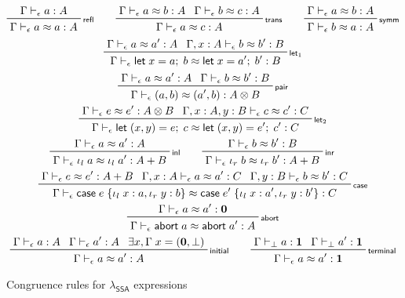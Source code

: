 \documentclass[acmsmall,screen,review]{acmart}
\newcommand{\mb}[1]{\ensuremath{\mathbf{#1}}}
\newcommand{\ms}[1]{\ensuremath{\mathsf{#1}}}
\newcommand{\lto}{:}
\newcommand{\linl}[1]{\iota_l\;{#1}}
\newcommand{\linr}[1]{\iota_r\;{#1}}
\newcommand{\labort}[1]{\ms{abort}\;{#1}}
\newcommand{\letexpr}[3]{\ensuremath{\ms{let}\;#1 = #2;\;#3}}
\newcommand{\caseexpr}[5]{\ms{case}\;#1\;\{\linl{#2} \lto #3, \linr{#4} \lto #5\}}
\newcommand{\bhyp}[2]{#1 : #2}
\newcommand{\rle}[1]{{\scriptsize\textsf{#1}}}
\newcommand{\hasty}[4]{#1 \vdash_{#2} #3: {#4}}
\newcommand{\teqv}{\approx}
\newcommand{\tmeq}[5]{#1 \vdash_{#2} #3 \teqv #4 : {#5}}
\newcommand{\isotopessa}{\(\lambda_{\ms{SSA}}\)}
\begin{document}
\begin{figure}
  \begin{gather*}
    \prftree[r]{\rle{refl}}{\hasty{\Gamma}{\epsilon}{a}{A}}{\tmeq{\Gamma}{\epsilon}{a}{a}{A}} \qquad
    \prftree[r]{\rle{trans}}
      {\tmeq{\Gamma}{\epsilon}{a}{b}{A}}
      {\tmeq{\Gamma}{\epsilon}{b}{c}{A}} 
      {\tmeq{\Gamma}{\epsilon}{a}{c}{A}} \qquad
    \prftree[r]{\rle{symm}}
      {\tmeq{\Gamma}{\epsilon}{a}{b}{A}}
      {\tmeq{\Gamma}{\epsilon}{b}{a}{A}}
    \\
    \prftree[r]{\rle{let$_1$}}
      {\tmeq{\Gamma}{\epsilon}{a}{a'}{A}}
      {\tmeq{\Gamma, \bhyp{x}{A}}{\epsilon}{b}{b'}{B}}
      {\tmeq{\Gamma}{\epsilon}{\letexpr{x}{a}{b}}{\letexpr{x}{a'}{b'}}{B}} 
    \\
    \prftree[r]{\rle{pair}}
      {\tmeq{\Gamma}{\epsilon}{a}{a'}{A}}
      {\tmeq{\Gamma}{\epsilon}{b}{b'}{B}}
      {\tmeq{\Gamma}{\epsilon}{(a, b)}{(a', b)}{A \otimes B}}
    \\
    \prftree[r]{\rle{let$_2$}}
      {\tmeq{\Gamma}{\epsilon}{e}{e'}{A \otimes B}}
      {\tmeq{\Gamma, \bhyp{x}{A}, \bhyp{y}{B}}{\epsilon}{c}{c'}{C}}
      {\tmeq{\Gamma}{\epsilon}{\letexpr{(x, y)}{e}{c}}{\letexpr{(x, y)}{e'}{c'}}{C}}
    \\
    \prftree[r]{\rle{inl}}
      {\tmeq{\Gamma}{\epsilon}{a}{a'}{A}}
      {\tmeq{\Gamma}{\epsilon}{\linl{a}}{\linl{a'}}{A + B}} \qquad
    \prftree[r]{\rle{inr}}
      {\tmeq{\Gamma}{\epsilon}{b}{b'}{B}}
      {\tmeq{\Gamma}{\epsilon}{\linr{b}}{\linr{b'}}{A + B}} \qquad
    \\
    \prftree[r]{\rle{case}}
      {\tmeq{\Gamma}{\epsilon}{e}{e'}{A + B}}
      {\tmeq{\Gamma, \bhyp{x}{A}}{\epsilon}{a}{a'}{C}}
      {\tmeq{\Gamma, \bhyp{y}{B}}{\epsilon}{b}{b'}{C}}
      {\tmeq{\Gamma}{\epsilon}{\caseexpr{e}{x}{a}{y}{b}}{\caseexpr{e'}{x}{a'}{y}{b'}}{C}}
    \\
    \prftree[r]{\rle{abort}}
      {\tmeq{\Gamma}{\epsilon}{a}{a'}{\mb{0}}}
      {\tmeq{\Gamma}{\epsilon}{\labort{a}}{\labort{a'}}{A}}
    \\
    \prftree[r]{\rle{initial}} 
      {\hasty{\Gamma}{\epsilon}{a}{A}}
      {\hasty{\Gamma}{\epsilon}{a'}{A}}
      {\exists x, \Gamma\;x = (\mb{0}, \bot)}
      {\tmeq{\Gamma}{\epsilon}{a}{a'}{A}}
      \qquad
    \prftree[r]{\rle{terminal}}
      {\hasty{\Gamma}{\bot}{a}{\mb{1}}}
      {\hasty{\Gamma}{\bot}{a'}{\mb{1}}}
      {\tmeq{\Gamma}{\epsilon}{a}{a'}{\mb{1}}}
  \end{gather*}
  \caption{Congruence rules for \isotopessa{} expressions}
  \Description{}
  \label{fig:ssa-expr-congr-rules}
\end{figure}
\end{document}
